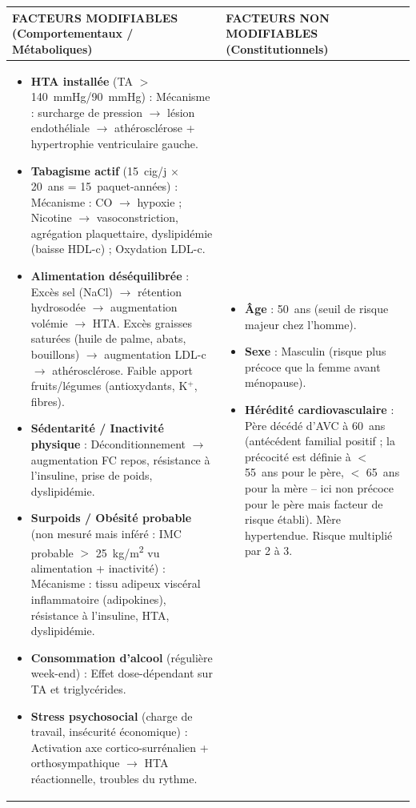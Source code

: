 \documentclass[11pt]{article}
\begin{document}
\begin{exoresolu}
\begin{center}
\begin{tabularx}{\linewidth}{|>{\bfseries}X|X|}\hline
\textbf{FACTEURS MODIFIABLES (Comportementaux / Métaboliques)} & \textbf{FACTEURS NON MODIFIABLES (Constitutionnels)} \\ \hline
\begin{itemize}
    \item \textbf{HTA installée} (TA $>$ \SI{140}{\mmHg}/\SI{90}{\mmHg}) : Mécanisme : surcharge de pression $\rightarrow$ lésion endothéliale $\rightarrow$ athérosclérose + hypertrophie ventriculaire gauche.
    \item \textbf{Tabagisme actif} (15~cig/j $\times$ 20~ans = 15~paquet-années) : Mécanisme : CO $\rightarrow$ hypoxie ; Nicotine $\rightarrow$ vasoconstriction, agrégation plaquettaire, dyslipidémie (baisse HDL-c) ; Oxydation LDL-c.
    \item \textbf{Alimentation déséquilibrée} : Excès sel (NaCl) $\rightarrow$ rétention hydrosodée $\rightarrow$ augmentation volémie $\rightarrow$ HTA. Excès graisses saturées (huile de palme, abats, bouillons) $\rightarrow$ augmentation LDL-c $\rightarrow$ athérosclérose. Faible apport fruits/légumes (antioxydants, K$^+$, fibres).
    \item \textbf{Sédentarité / Inactivité physique} : Déconditionnement $\rightarrow$ augmentation FC repos, résistance à l'insuline, prise de poids, dyslipidémie.
    \item \textbf{Surpoids / Obésité probable} (non mesuré mais inféré : IMC probable $>$ \SI{25}{kg/m^2} vu alimentation + inactivité) : Mécanisme : tissu adipeux viscéral inflammatoire (adipokines), résistance à l'insuline, HTA, dyslipidémie.
    \item \textbf{Consommation d'alcool} (régulière week-end) : Effet dose-dépendant sur TA et triglycérides.
    \item \textbf{Stress psychosocial} (charge de travail, insécurité économique) : Activation axe cortico-surrénalien + orthosympathique $\rightarrow$ HTA réactionnelle, troubles du rythme.
\end{itemize}
&
\begin{itemize}
    \item \textbf{Âge} : 50~ans (seuil de risque majeur chez l'homme).
    \item \textbf{Sexe} : Masculin (risque plus précoce que la femme avant ménopause).
    \item \textbf{Hérédité cardiovasculaire} : Père décédé d'AVC à 60~ans (antécédent familial positif ; la précocité est définie à $<$ 55~ans pour le père, $<$ 65~ans pour la mère -- ici non précoce pour le père mais facteur de risque établi). Mère hypertendue. Risque multiplié par 2 à 3.
\end{itemize}
\\ \hline
\end{tabularx}
\end{center}


\end{exoresolu}
\end{document}
